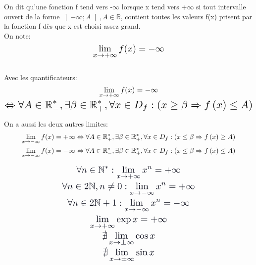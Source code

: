 \documentclass[a4paper, 10pt]{article}
\renewcommand{\large}{\color{text}}
\renewcommand{\textbf}{\color{crimson}}
\begin{document}
	\newpage
	\textbf{Définition:}
	\large On dit qu'une fonction f tend vers -$\infty$ lorsque x tend vers +$\infty$
	si tout intervalle ouvert de la forme $\left]-\infty; A\right[, A\in\mathbb{R}$, contient toutes les valeurs f(x)
	prisent par la fonction f dès que x est choisi assez grand.\\
	On note:
	\begin{displaymath}
		\scaleto{\lim_{x\to+\infty} f(x) = -\infty}{20pt}
	\end{displaymath}
	\\
	\large Avec les quantificateurs:
	\begin{gather*}
		\scaleto{\lim_{x\to+\infty} f(x) = -\infty}{20pt} 
		\\
		\scaleto{\Leftrightarrow\forall A \in\mathbb{R}_{-}^{*},\exists\beta\in\mathbb{R}_{+}^{*},\forall x \in D_{f} : \left(x\geq\beta\Rightarrow f\left(x\right)\leq A \right)}{20pt}
	\end{gather*}

	
	\begin{center}
		\vspace{30pt}
		\small On a aussi les deux autres limites:
		\begin{gather*}
			\scaleto{\lim_{x\to-\infty} f(x) = +\infty\Leftrightarrow\forall A \in\mathbb{R}_{+}^{*},\exists\beta\in\mathbb{R}_{+}^{*},\forall x \in D_{f} : \left(x\leq\beta\Rightarrow f\left(x\right)\geq A \right)}{15pt}
			\\
			\scaleto{\lim_{x\to-\infty} f(x) = -\infty\Leftrightarrow\forall A \in\mathbb{R}_{-}^{*},\exists\beta\in\mathbb{R}_{+}^{*},\forall x \in D_{f} : \left(x\leq\beta\Rightarrow f\left(x\right)\leq A \right)}{15pt}
		\end{gather*}
	\end{center}

	\vspace{30pt}
	\textbf{Propriétés (Admises):}
	\begin{gather}
		\color{text} \scaleto{\forall n\in\mathbb{N}^{*}: \lim_{x\to+\infty}x^{n}=+\infty}{20pt} \label{xn} 
		\\ \color{text} \scaleto{\forall n\in2\mathbb{N}, n\neq0: \lim_{x\to-\infty}x^{n}=+\infty}{20pt}
		\\ \color{text} \scaleto{\forall n\in2\mathbb{N}+1: \lim_{x\to-\infty}x^{n}=-{\infty}}{20pt}
		\\ \color{text} \scaleto{\lim_{x\to+\infty}\exp{x}=+\infty}{20pt}
		\\ \color{text} \scaleto{\nexists\lim_{x\to\pm\infty}\cos{x}}{20pt} 
		\\ \color{text} \scaleto{\nexists\lim_{x\to\pm\infty}\sin{x}}{20pt}
	\end{gather}
\end{document}
